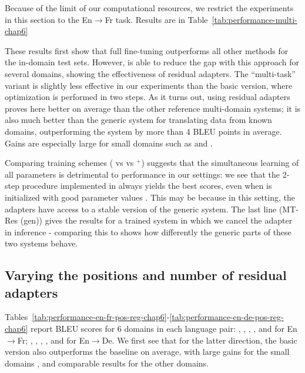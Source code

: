 Because of the limit of our computational resources, we restrict the experiments in this section to the En$\rightarrow$Fr task. Results are in Table~\ref{tab:performance-multi-chap6}

These results first show that full fine-tuning outperforms all other methods for the in-domain test sets. However,  is able to reduce the gap with this approach for several domains, showing the effectiveness of residual adapters. The ``multi-task'' variant is slightly less effective in our experiments than the basic version, where optimization is performed in two steps. As it turns out, using residual adapters proves here better on average than the other reference multi-domain systems; it is also much better than the generic system for translating data from known domains, outperforming the  system by more than 4 BLEU points in average. Gains are especially large for small domains such as  and .

Comparing training schemes ( vs  vs $^+$) suggests that the simultaneous learning of all parameters is detrimental to performance in our settings: we see that the 2-step procedure implemented in  always yields the best scores, even when  is initialized with good parameter values . This may be because in this setting, the adapters have access to a stable version of the generic system. The last line ({MT-Res} (gen)) gives the results for a  trained system in which we cancel the adapter in inference - comparing this to  shows how differently the generic parts of these two systems behave.

\subsection{Varying the positions and number of residual adapters}
Tables~\ref{tab:performance-en-fr-pos-reg-chap6}-\ref{tab:performance-en-de-pos-reg-chap6} report BLEU scores for 6 domains in each language pair: , , , , and  for En$\rightarrow$Fr; , , , ,  and  for En$\rightarrow$De. We first see that for the latter direction, the basic version  also outperforms the  baseline on average, with large gains for the small domains ,  and comparable results for the other domains.


